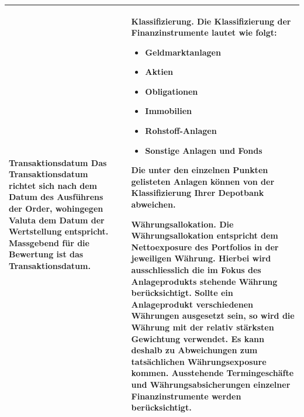 \documentclass[9pt,landscape,a4paper]{report}
\begin{document}
\begin{tabular}{p{10cm} p{1cm} p{10cm}}
\vspace*{0.1cm}
\textbf{Transaktionsdatum} Das Transaktionsdatum richtet sich nach dem Datum des Ausführens der Order, wohingegen Valuta dem Datum der Wertstellung entspricht. Massgebend für die Bewertung ist das Transaktionsdatum.

& &
\textbf{Klassifizierung. } Die Klassifizierung der Finanzinstrumente lautet wie folgt:
\begin{itemize}
\item Geldmarktanlagen
\item Aktien
\item Obligationen
\item Immobilien
\item Rohstoff-Anlagen
\item Sonstige Anlagen und Fonds
\end{itemize}
Die unter den einzelnen Punkten gelisteten Anlagen können von der Klassifizierung Ihrer Depotbank abweichen.

\vspace*{0.1cm}
\textbf{Währungsallokation.} Die Währungsallokation entspricht dem Nettoexposure des Portfolios in der jeweiligen Währung. Hierbei wird ausschliesslich die im Fokus des Anlageprodukts stehende Währung berücksichtigt. Sollte ein Anlageprodukt verschiedenen Währungen ausgesetzt sein, so wird die Währung mit der relativ stärksten Gewichtung verwendet. Es kann deshalb zu Abweichungen zum tatsächlichen Währungsexposure kommen. Ausstehende Termingeschäfte und Währungsabsicherungen einzelner Finanzinstrumente werden berücksichtigt.

\\ \hline

\end{tabular}
\end{document}
